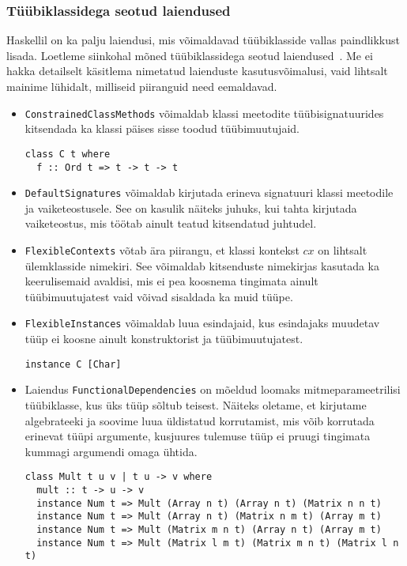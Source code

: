 \documentclass[12pt]{article}
\begin{document}
      \subsubsection{Tüübiklassidega seotud laiendused}
        Haskellil on ka palju laiendusi, mis võimaldavad tüübiklasside vallas paindlikkust lisada. Loetleme siinkohal mõned tüübiklassidega seotud laiendused~\cite{Gla}. Me ei hakka detailselt käsitlema nimetatud laienduste kasutusvõimalusi, vaid lihtsalt mainime lühidalt, milliseid piiranguid need eemaldavad.

        \begin{itemize}
          \item
            \verb!ConstrainedClassMethods! võimaldab klassi meetodite tüübisignatuurides kitsendada ka klassi päises sisse toodud tüübimuutujaid.

            \begin{verbatim}class C t where
  f :: Ord t => t -> t -> t\end{verbatim}
          \item
            \verb!DefaultSignatures! võimaldab kirjutada erineva signatuuri klassi meetodile ja vaiketeostusele. See on kasulik näiteks juhuks, kui tahta kirjutada vaiketeostus, mis töötab ainult teatud kitsendatud juhtudel.
          \item
            \verb!FlexibleContexts! võtab ära piirangu, et klassi kontekst $cx$ on lihtsalt ülemklasside nimekiri. See võimaldab kitsenduste nimekirjas kasutada ka keerulisemaid avaldisi, mis ei pea koosnema tingimata ainult tüübimuutujatest vaid võivad sisaldada ka muid tüüpe.
          \item
            \verb!FlexibleInstances! võimaldab luua esindajaid, kus esindajaks muudetav tüüp ei koosne ainult konstruktorist ja tüübimuutujatest.

            \begin{verbatim}instance C [Char]\end{verbatim}
          \item
            Laiendus \verb!FunctionalDependencies! on mõeldud loomaks mitmeparameetrilisi tüübiklasse, kus üks tüüp sõltub teisest. Näiteks oletame, et kirjutame algebrateeki ja soovime luua üldistatud korrutamist, mis võib korrutada erinevat tüüpi argumente, kusjuures tulemuse tüüp ei pruugi tingimata kummagi argumendi omaga ühtida.

            \begin{verbatim}class Mult t u v | t u -> v where
  mult :: t -> u -> v
  instance Num t => Mult (Array n t) (Array n t) (Matrix n n t)
  instance Num t => Mult (Array n t) (Matrix n m t) (Array m t)
  instance Num t => Mult (Matrix m n t) (Array n t) (Array m t)
  instance Num t => Mult (Matrix l m t) (Matrix m n t) (Matrix l n t)\end{verbatim}


\end{itemize}
\end{document}
